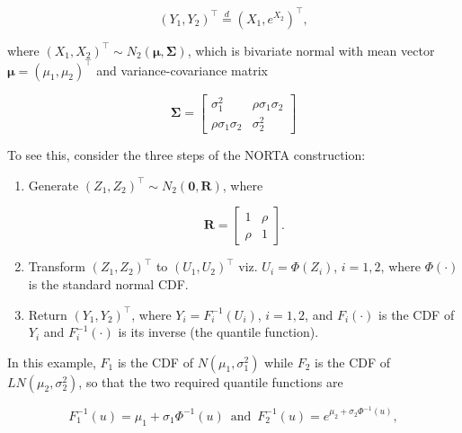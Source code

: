 \documentclass[
]{jss}
\begin{document}
\begin{equation}
\label{eq:kram1}
(Y_1, Y_2)^\top \stackrel{d}{=} \left(X_1, e^{X_2}\right)^\top,
\end{equation}

where \((X_1, X_2)^\top \sim N_2(\boldsymbol \mu, \boldsymbol \Sigma)\), which is bivariate normal with mean vector \(\boldsymbol \mu = (\mu_1, \mu_2)^\top\) and variance-covariance matrix

\begin{equation}
\label{eq:kram2}
\boldsymbol \Sigma = 
\begin{bmatrix}
\sigma_1^2 & \rho \sigma_1\sigma_2\\
\rho \sigma_1\sigma_2 & \sigma_2^2
\end{bmatrix}
\end{equation}

To see this, consider the three steps of the NORTA construction:

\begin{enumerate}

\item Generate $(Z_1, Z_2)^\top \sim N_2(\boldsymbol 0, \boldsymbol R)$, where 

\begin{equation}
\label{eq:kram3}
\boldsymbol R = 
\left[
\begin{array}{cc}
1 & \rho \\
\rho & 1
\end{array}
\right].
\end{equation}


\item Transform $(Z_1, Z_2)^\top$ to $(U_1, U_2)^\top$ viz. $U_i =\Phi(Z_i)$,  $i=1,2$, where $\Phi(\cdot)$ is the standard normal CDF. 

\item Return $(Y_1, Y_2)^\top$, where $Y_i=F_i^{-1}(U_i)$, $i=1,2$, and $F_i(\cdot)$ is the CDF of $Y_i$ and $F_i^{-1}(\cdot)$ is its inverse (the quantile function). 

\end{enumerate}

In this example, \(F_1\) is the CDF of \(N(\mu_1, \sigma_1^2)\) while \(F_2\) is the CDF of \(LN(\mu_2, \sigma_2^2)\), so that the two required quantile functions are

\begin{equation}
\label{eq:kram4}
F_1^{-1}(u) = \mu_1+\sigma_1 \Phi^{-1}(u)\,\,\, \mbox{and} \,\,\, F_2^{-1}(u) = e^{\mu_2+\sigma_2 \Phi^{-1}(u)}, 
\end{equation}
\end{document}
